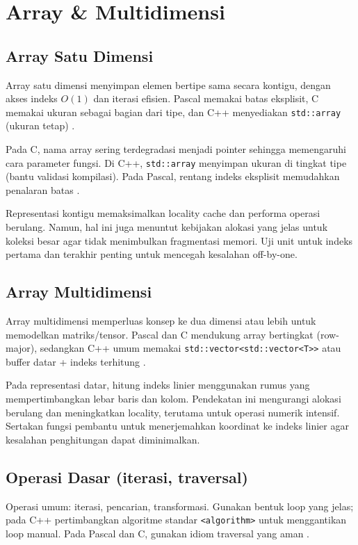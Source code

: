\documentclass[../main.tex]{subfiles}
\begin{document}
\chapter{Array \& Multidimensi}
\section{Array Satu Dimensi}
Array satu dimensi menyimpan elemen bertipe sama secara kontigu, dengan akses indeks \(O(1)\) dan iterasi efisien. Pascal memakai batas eksplisit, C memakai ukuran sebagai bagian dari tipe, dan C++ menyediakan \texttt{std::array} (ukuran tetap) \parencite{pascal-tutorial-wikibooks,iso-c-draft-n1570,cpp-reference,cpp-std-array}.

Pada C, nama array sering terdegradasi menjadi pointer sehingga memengaruhi cara parameter fungsi. Di C++, \texttt{std::array} menyimpan ukuran di tingkat tipe (bantu validasi kompilasi). Pada Pascal, rentang indeks eksplisit memudahkan penalaran batas \parencite{free-pascal-docs,cpp-std-array}.

Representasi kontigu memaksimalkan locality cache dan performa operasi berulang. Namun, hal ini juga menuntut kebijakan alokasi yang jelas untuk koleksi besar agar tidak menimbulkan fragmentasi memori. Uji unit untuk indeks pertama dan terakhir penting untuk mencegah kesalahan off-by-one.

\section{Array Multidimensi}
Array multidimensi memperluas konsep ke dua dimensi atau lebih untuk memodelkan matriks/tensor. Pascal dan C mendukung array bertingkat (row-major), sedangkan C++ umum memakai \texttt{std::vector<std::vector<T>>} atau buffer datar + indeks terhitung \parencite{iso-c-draft-n1570,cpp-reference,cpp-vector}.

Pada representasi datar, hitung indeks linier menggunakan rumus yang mempertimbangkan lebar baris dan kolom. Pendekatan ini mengurangi alokasi berulang dan meningkatkan locality, terutama untuk operasi numerik intensif. Sertakan fungsi pembantu untuk menerjemahkan koordinat ke indeks linier agar kesalahan penghitungan dapat diminimalkan.

\section{Operasi Dasar (iterasi, traversal)}
Operasi umum: iterasi, pencarian, transformasi. Gunakan bentuk loop yang jelas; pada C++ pertimbangkan algoritme standar \texttt{<algorithm>} untuk menggantikan loop manual. Pada Pascal dan C, gunakan idiom traversal yang aman \parencite{free-pascal-docs,gnu-c-manual}.
\end{document}
